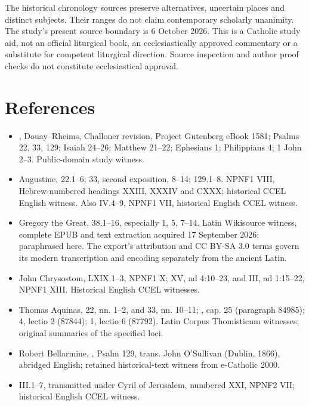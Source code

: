 The historical chronology sources preserve alternatives, uncertain places and distinct subjects. Their ranges do not claim contemporary scholarly unanimity. The study's present source boundary is 6 October 2026. This is a Catholic study aid, not an official liturgical book, an ecclesiastically approved commentary or a substitute for competent liturgical direction. Source inspection and author proof checks do not constitute ecclesiastical approval.

\section{References}
\begin{itemize}
\item {}, Douay--Rheims, Challoner revision, Project Gutenberg eBook 1581; Psalms 22, 33, 129; Isaiah 24--26; Matthew 21--22; Ephesians 1; Philippians 4; 1 John 2--3. Public-domain study witness.
\item Augustine,  22.1--6; 33, second exposition, 8--14; 129.1--8. NPNF1 VIII, Hebrew-numbered headings XXIII, XXXIV and CXXX; historical CCEL English witness. Also  IV.4--9, NPNF1 VII, historical English CCEL witness.
\item Gregory the Great,  38.1--16, especially 1, 5, 7--14. Latin Wikisource witness, complete EPUB and text extraction acquired 17 September 2026; paraphrased here. The export's attribution and CC BY-SA 3.0 terms govern its modern transcription and encoding separately from the ancient Latin.
\item John Chrysostom,  LXIX.1--3, NPNF1 X;  XV, ad 4:10--23, and  III, ad 1:15--22, NPNF1 XIII. Historical English CCEL witnesses.
\item Thomas Aquinas,  22, nn. 1--2, and 33, nn. 10--11; , cap. 25 (paragraph 84985);  4, lectio 2 (87844);  1, lectio 6 (87792). Latin Corpus Thomisticum witnesses; original summaries of the specified loci.
\item Robert Bellarmine, , Psalm 129, trans. John O'Sullivan (Dublin, 1866), abridged English; retained historical-text witness from e-Catholic 2000.
\item {} III.1--7, transmitted under Cyril of Jerusalem, numbered  XXI, NPNF2 VII; historical English CCEL witness.

\end{itemize}
